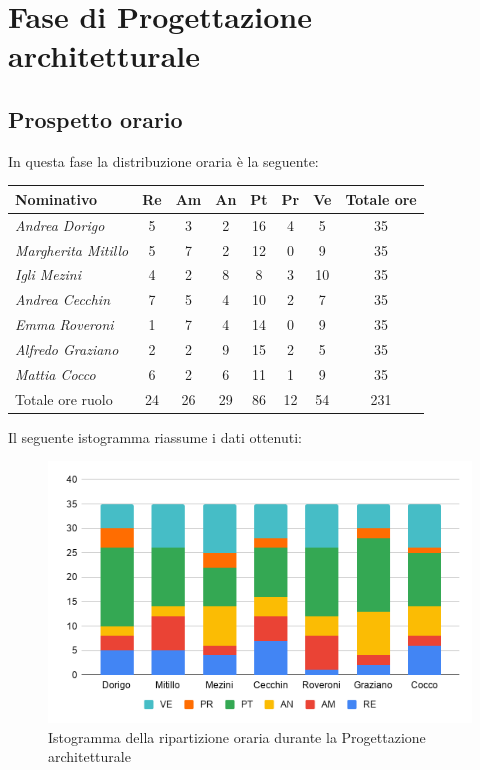 {{{{\section{Fase di Progettazione architetturale}\label{PreventivoFaseDiProgettazioneArchitetturale}

\subsection{Prospetto orario}\label{PreventivoFaseDiProgettazioneArchitetturaleProspettoOrario}
In questa fase la distribuzione oraria è la seguente:
\quad
\def\tabularxcolumn#1{m{#1}}
{

	\begin{center}
		\renewcommand{\arraystretch}{1.4}
		\begin{tabularx}{\textwidth}{|X|c|c|c|c|c|c|c|}
			\hline
			\rowcolor{airforceblue}
			\textbf{Nominativo} & \textbf{Re} & \textbf{Am} & \textbf{An} & \textbf{Pt} & \textbf{Pr} & \textbf{Ve} & \textbf{Totale ore}\\
			\hline
			\textit{Andrea Dorigo} & 5 & 3 & 2 & 16 & 4 & 5 & 35\\
			\hline
			\textit{Margherita Mitillo} & 5 & 7 & 2 & 12 & 0 & 9 & 35\\
			\hline
			\textit{Igli Mezini} & 4 & 2 & 8 & 8 & 3 & 10 & 35\\
			\hline
			\textit{Andrea Cecchin} & 7 & 5 & 4 & 10 & 2 & 7 & 35\\
			\hline
			\textit{Emma Roveroni} & 1 & 7 & 4 & 14 & 0 & 9 & 35\\
			\hline
			\textit{Alfredo Graziano} & 2 & 2 & 9 & 15 & 2 & 5 & 35\\
			\hline
			\textit{Mattia Cocco} & 6 & 2 & 6 & 11 & 1 & 9 & 35\\
			\hline
			Totale ore ruolo & 24 & 26 & 29 & 86 & 12 & 54 & 231\\
			\hline
		\end{tabularx}
	\end{center}

Il seguente istogramma riassume i dati ottenuti:
\begin{figure}[!h]
	\begin{center}
		\includegraphics[width=0.7\linewidth]{../immagini/pdp/istogramma_progettazione_architetturale.png}
		\caption{Istogramma della ripartizione oraria durante la Progettazione architetturale}
	\end{center}
\end{figure}

}}}}}

